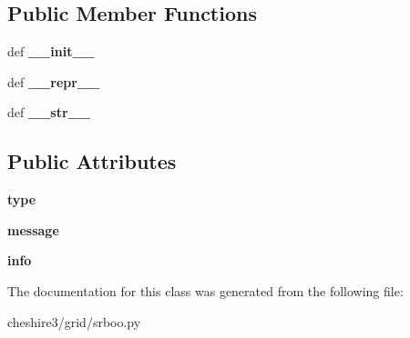 \subsection*{Public Member Functions}
\begin{DoxyCompactItemize}
\item 
\hypertarget{classcheshire3_1_1grid_1_1srboo_1_1_srb_exception_affa5909f4030c43508a082090dae85a4}{def {\bfseries \-\_\-\-\_\-init\-\_\-\-\_\-}}\label{classcheshire3_1_1grid_1_1srboo_1_1_srb_exception_affa5909f4030c43508a082090dae85a4}

\item 
\hypertarget{classcheshire3_1_1grid_1_1srboo_1_1_srb_exception_ac9a7f36114207abfa3f19e3c388c1fc5}{def {\bfseries \-\_\-\-\_\-repr\-\_\-\-\_\-}}\label{classcheshire3_1_1grid_1_1srboo_1_1_srb_exception_ac9a7f36114207abfa3f19e3c388c1fc5}

\item 
\hypertarget{classcheshire3_1_1grid_1_1srboo_1_1_srb_exception_aab99b27101e58563580c82fda152edc5}{def {\bfseries \-\_\-\-\_\-str\-\_\-\-\_\-}}\label{classcheshire3_1_1grid_1_1srboo_1_1_srb_exception_aab99b27101e58563580c82fda152edc5}

\end{DoxyCompactItemize}
\subsection*{Public Attributes}
\begin{DoxyCompactItemize}
\item 
\hypertarget{classcheshire3_1_1grid_1_1srboo_1_1_srb_exception_a601469372a26bd668bce8ea45b7a3a3d}{{\bfseries type}}\label{classcheshire3_1_1grid_1_1srboo_1_1_srb_exception_a601469372a26bd668bce8ea45b7a3a3d}

\item 
\hypertarget{classcheshire3_1_1grid_1_1srboo_1_1_srb_exception_a16cf96176c1d0ae2d64febda951007bd}{{\bfseries message}}\label{classcheshire3_1_1grid_1_1srboo_1_1_srb_exception_a16cf96176c1d0ae2d64febda951007bd}

\item 
\hypertarget{classcheshire3_1_1grid_1_1srboo_1_1_srb_exception_a97f51b0f8b04c72c1daffc248be5f108}{{\bfseries info}}\label{classcheshire3_1_1grid_1_1srboo_1_1_srb_exception_a97f51b0f8b04c72c1daffc248be5f108}

\end{DoxyCompactItemize}


The documentation for this class was generated from the following file\-:\begin{DoxyCompactItemize}
\item 
cheshire3/grid/srboo.\-py\end{DoxyCompactItemize}
